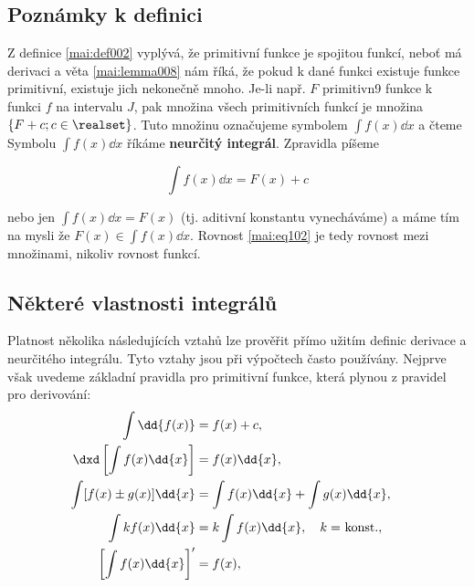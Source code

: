     \subsection{Poznámky k definici}  
      Z definice \ref{mai:def002} vyplývá, že primitivní funkce je spojitou funkcí, neboť má
      derivaci a věta \ref{mai:lemma008} nám říká, že pokud k dané funkci existuje funkce
      primitivní, existuje jich nekonečně mnoho. Je-li např. \(F\) primitivn9 funkce k funkci \(f\)
      na intervalu \(J\), pak množina všech primitivních funkcí je množina \(\{F + c;
      c\in\realset\}\). Tuto množinu označujeme symbolem \(\int f(x)\dd{x}\) a čteme  Symbolu \(\int f(x)\dd{x}\) říkáme \textbf{neurčitý integrál}. Zpravidla
      píšeme
      \begin{mdframed}[style=mdmathlemma]  
        \begin{equation}\label{mai:eq102}
          \int f(x)\dd{x} = F(x) + c
        \end{equation}
      \end{mdframed}
      nebo jen \(\int f(x)\dd{x} = F(x)\) (tj. aditivní konstantu vynecháváme) a máme tím na mysli
      že \(F(x) \in \int f(x)\dd{x}\). Rovnost \ref{mai:eq102} je tedy rovnost mezi množinami,
      nikoliv rovnost funkcí. 
    
    \subsection{Některé vlastnosti integrálů}  
      Platnost několika následujících vztahů lze prověřit přímo užitím deﬁnic derivace a neurčitého
      integrálu. Tyto vztahy jsou při výpočtech často používány. Nejprve však uvedeme základní
      pravidla pro primitivní funkce, která plynou z pravidel pro derivování:
      \begin{subequations}
        \begin{flalign}
          \int\dd{f(x)} &= f(x) + c,                                          &\label{mai:eq134} \\
          \dxd\left[\int f(x)\dd{x}\right] &= f(x)\dd{x},                     &\label{mai:eq135} \\
          \int[f(x)\pm g(x)]\dd{x}&= \int f(x)\dd{x} + \int g(x)\dd{x},       &\label{mai:eq103} \\
          \int kf(x)\dd{x}      &=k\int f(x)\dd{x},\quad\text{\(k=\) konst.}, &\label{mai:eq104} \\
          \left[\int f(x)\dd{x}\right]' &= f(x),                              &\label{mai:eq136}
        \end{flalign}
      \end{subequations}
  
